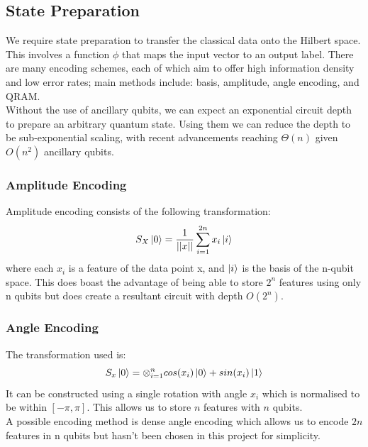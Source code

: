 \documentclass[12pt]{article}
\numberwithin{equation}{section}
\begin{document}
\subsection{State Preparation}
We require state preparation to transfer the classical data onto the 
Hilbert space. This involves a function $\phi$ that maps the input vector to 
an output label. There are many encoding schemes, each of which aim to offer 
high information density and low error rates; main methods include: basis, amplitude, angle encoding, and QRAM. 
\\
Without the use of ancillary qubits, we can expect an exponential circuit depth
to prepare an arbitrary quantum state. Using them we can reduce the depth to be 
sub-exponential scaling, with recent advancements reaching $\Theta(n)$ given $O(n^2)$
ancillary qubits.
\cite{shaib_efficient_2023,zhang_quantum_2022}


\subsubsection{Amplitude Encoding}
Amplitude encoding consists of the following transformation:\\
\begin{equation}
S_X \ket{0} = \frac{1}{||x||}\sum^{2n}_{i=1}{x_i\ket{i}}
\end{equation}
where each $x_i$ is a feature of the data point x, and $\ket{i}$ is the basis 
of the n-qubit
space. This does boast the advantage of being able to store $2^n$ features using 
only n qubits but does create a resultant circuit with depth $O(2^n)$.

\subsubsection{Angle Encoding}
The transformation used is:
\begin{equation}
S_x\ket{0} = \otimes^n_{i=1} cos(x_i)\ket{0} + sin(x_i)\ket{1}
\end{equation}
It can be constructed using a single rotation with angle $x_i$ which is 
normalised to be within $[-\pi,\pi]$. This allows us to store $n$ features with 
$n$ qubits.
\\
A possible encoding method is dense angle encoding which allows us to encode $2n$ 
features in n qubits but hasn't been chosen in this project for simplicity.
\end{document}
